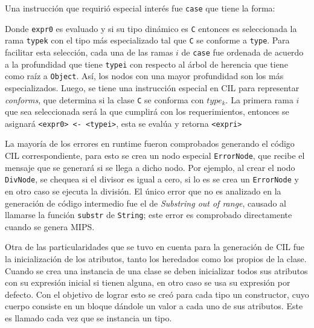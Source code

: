 \documentclass[11pt]{scrartcl} %
\begin{document}
Una instrucción que requirió especial interés fue \texttt{case} que tiene la forma:



Donde \texttt{expr0} es evaluado y si su tipo dinámico es \texttt{C} entonces es seleccionada la rama \texttt{typek} con el tipo más especializado tal que \texttt{C} se conforme a \texttt{type}. Para facilitar esta selección, cada una de las ramas $i$ de \texttt{case} fue ordenada de acuerdo a la profundidad que tiene \texttt{typei} con respecto al árbol de herencia que tiene como raíz a \texttt{Object}. Así, los nodos con una mayor profundidad son los más especializados. Luego, se tiene una instrucción especial en CIL para representar \textit{conforms}, que determina si la clase \texttt{C} se conforma con \texttt{$type_k$}. La primera rama $i$ que sea seleccionada será la que cumplirá con los requerimientos, entonces se asignará \texttt{<expr0> <- <typei>}, esta se evalúa y retorna \texttt{<expri>}

La mayoría de los errores en runtime fueron comprobados generando el código CIL correspondiente, para esto se crea un nodo especial \texttt{ErrorNode}, que recibe el mensaje que se generará si se llega a dicho nodo. Por ejemplo, al crear el nodo \texttt{DivNode}, se chequea si el divisor es igual a cero, si lo es se crea un \texttt{ErrorNode} y en otro caso se ejecuta la división. El único error que no es analizado en la generación de código intermedio fue el de \textit{Substring out of range}, causado al llamarse la función \texttt{substr} de \texttt{String}; este error es comprobado directamente cuando se genera MIPS.

Otra de las particularidades que se tuvo en cuenta para la generación de CIL fue la inicialización de los atributos, tanto los heredados como los propios de la clase. Cuando se crea una instancia de una clase se deben inicializar todos sus atributos con su expresión inicial si tienen alguna, en otro caso se usa su expresión por defecto. Con el objetivo de lograr esto se creó para cada tipo un constructor, cuyo cuerpo consiste en un bloque dándole un valor a cada uno de sus atributos. Este es llamado cada vez que se instancia un tipo.
\end{document}

